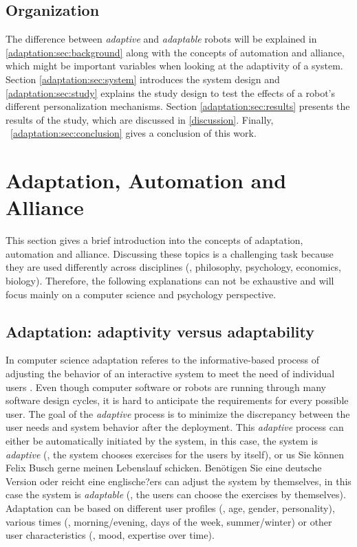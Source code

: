\documentclass[twocolumn]{svjour3}          %
\begin{document}
\subsection{Organization}

The difference between \textit{adaptive} and \textit{adaptable} robots will be explained
in \autoref{adaptation:sec:background} along with the concepts of
automation and alliance, which might be important variables when
looking at the adaptivity of a system. Section \ref{adaptation:sec:system}
introduces the system design and \autoref{adaptation:sec:study} explains the
study design to test the effects of a robot's different personalization
mechanisms. Section \ref{adaptation:sec:results} presents the results of the
study, which are discussed in \autoref{discussion}. Finally,
~\autoref{adaptation:sec:conclusion} gives a conclusion of this work.

\hypertarget{adaptation-automation-and-alliance}{%
\section{\texorpdfstring{Adaptation, Automation and Alliance
\label{adaptation:sec:background}}{Adaptation, Automation and Alliance }}\label{adaptation-automation-and-alliance}}

This section gives a brief introduction into the concepts of adaptation,
automation and alliance. Discussing these topics is a challenging task
because they are used differently across disciplines (\eg{}, philosophy,
psychology, economics, biology). Therefore, the following explanations
can not be exhaustive and will focus mainly on a computer science and
psychology perspective.

\hypertarget{adaptation-adaptivity-versus-adaptability}{%
\subsection{Adaptation: adaptivity versus
adaptability}\label{adaptation-adaptivity-versus-adaptability}}

In computer science adaptation referes to the informative-based process of adjusting the behavior of an interactive system to meet the need of individual users \cite{schneider1993adaptive}.
Even though computer software or robots are running through many
software design cycles, it is hard to anticipate the requirements for
every possible user. The goal of the \textit{adaptive} process is to minimize the
discrepancy between the user needs and system behavior after the
deployment. This \textit{adaptive} process can either be automatically initiated
by the system, in this case, the system is \textit{adaptive} (\eg{}, the system
chooses exercises for the users by itself), or us Sie können Felix Busch gerne meinen Lebenslauf schicken. Benötigen Sie eine deutsche Version oder reicht eine englische?ers can adjust the
system by themselves, in this case the system is \textit{adaptable} (\eg{}, the
users can choose the exercises by themselves). Adaptation can be based
on different user profiles (\eg{}, age, gender, personality), various
times (\eg{}, morning/evening, days of the week, summer/winter) or other
user characteristics (\eg{}, mood, expertise over time).
\end{document}
